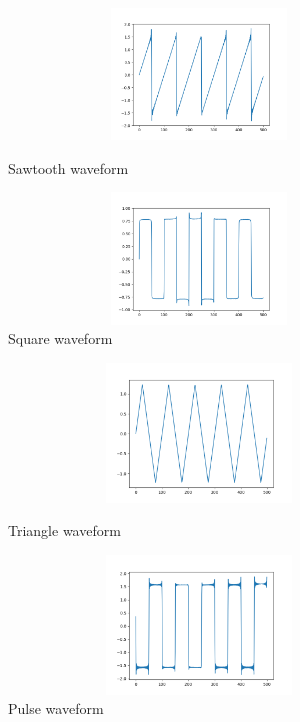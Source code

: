 \documentclass[runningheads]{llncs}
\begin{document}
\begin{figure}[!htb]
    \centering
    \begin{minipage}{0.45\textwidth}
        \centering
        \includegraphics[width=0.9\textwidth,height=3.5cm]{saw.png}
        \caption{Sawtooth waveform}
        \label{fig:sawtooth}
    \end{minipage}
    \begin{minipage}{0.45\textwidth}
        \centering
        \includegraphics[width=0.9\textwidth,height=3.5cm]{square.png}
        \caption{Square waveform}
        \label{fig:square}
    \end{minipage}
\end{figure}

\begin{figure}[!htb]
    \centering
    \begin{minipage}{0.45\textwidth}
        \centering
        \includegraphics[width=0.9\textwidth, height=3.7cm]{triangle.png}
        \caption{Triangle waveform}
        \label{fig:triangle}
    \end{minipage}
    \begin{minipage}{0.45\textwidth}
        \centering
        \includegraphics[width=0.9\textwidth,height=3.7cm]{pulse.png}
        \caption{Pulse waveform}
        \label{fig:pulse}
    \end{minipage}
\end{figure}
\end{document}
